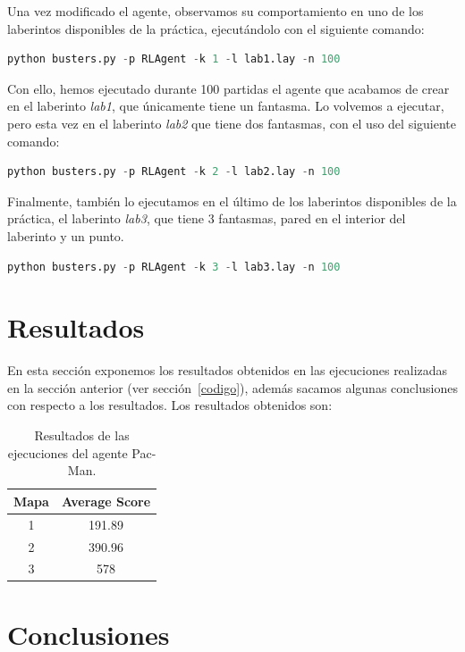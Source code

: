 \documentclass[11pt]{exam}
\begin{document}
Una vez modificado el agente, observamos su comportamiento en uno de los laberintos disponibles de la práctica, ejecutándolo con el siguiente comando:

\begin{lstlisting}[language=python, basicstyle=\footnotesize]
python busters.py -p RLAgent -k 1 -l lab1.lay -n 100
\end{lstlisting}

Con ello, hemos ejecutado durante 100 partidas el agente que acabamos de crear en el laberinto \textit{lab1}, que únicamente tiene un fantasma. Lo volvemos a ejecutar, pero esta vez en el laberinto \textit{lab2} que tiene dos fantasmas, con el uso del siguiente comando:

\begin{lstlisting}[language=python, basicstyle=\footnotesize]
python busters.py -p RLAgent -k 2 -l lab2.lay -n 100
\end{lstlisting}

Finalmente, también lo ejecutamos en el último de los laberintos disponibles de la práctica, el laberinto \textit{lab3}, que tiene 3 fantasmas, pared en el interior del laberinto y un punto.

\begin{lstlisting}[language=python, basicstyle=\footnotesize]
python busters.py -p RLAgent -k 3 -l lab3.lay -n 100
\end{lstlisting}

\section{Resultados}\label{resultados}

En esta sección exponemos los resultados obtenidos en las ejecuciones realizadas en la sección anterior (ver sección~\ref{codigo}), además sacamos algunas conclusiones con respecto a los resultados. Los resultados obtenidos son:

\begin{table}[H]
	\centering
	\begin{tabular}{|c|c|} 
		\hline
		Mapa & Average Score \\ 
		\hline
		1 & 191.89 \\ 
		2 & 390.96 \\
		3 & 578 \\
		\hline
	\end{tabular}
	\caption{Resultados de las ejecuciones del agente Pac-Man.}
	\label{resultados_ejecuciones}
\end{table}
\section{Conclusiones}\label{conclusiones}
\end{document}

